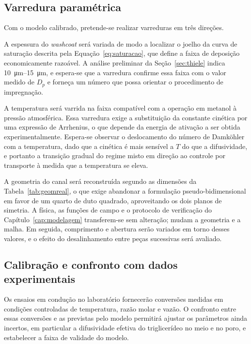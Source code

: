 \subsection{Varredura paramétrica}

Com o modelo calibrado, pretende-se realizar varreduras em três direções.

A espessura do \textit{washcoat} será variada de modo a localizar o joelho da
curva de saturação descrita pela Equação~\eqref{eq:saturacao}, que define a
faixa de deposição economicamente razoável. A análise preliminar da
Seção~\ref{sec:thiele} indica \SIrange{10}{15}{\micro\meter}, e espera-se que
a varredura confirme essa faixa com o valor medido de $D_p$ e forneça um número
que possa orientar o procedimento de impregnação.

A temperatura será varrida na faixa compatível com a operação em metanol à
pressão atmosférica. Essa varredura exige a substituição da constante cinética
por uma expressão de Arrhenius, o que depende da energia de ativação a ser
obtida experimentalmente. Espera-se observar o deslocamento do número de
Damköhler com a temperatura, dado que a cinética é mais sensível a $T$ do que a
difusividade, e portanto a transição gradual do regime misto em direção ao
controle por transporte à medida que a temperatura se eleva.

A geometria do canal será reconstruída segundo as dimensões da
Tabela~\ref{tab:geomreal}, o que exige abandonar a formulação pseudo-bidimensional
em favor de um quarto de duto quadrado, aproveitando os dois planos de simetria.
A física, as funções de campo e o protocolo de verificação do
Capítulo~\ref{cap:modelagem} transferem-se sem alteração; mudam a geometria e a
malha. Em seguida, comprimento e abertura serão variados em torno desses valores,
e o efeito do desalinhamento entre peças sucessivas será avaliado.

\subsection{Calibração e confronto com dados experimentais}

Os ensaios em condução no laboratório fornecerão conversões medidas em condições
controladas de temperatura, razão molar e vazão. O confronto entre essas
conversões e as previstas pelo modelo permitirá ajustar os parâmetros ainda
incertos, em particular a difusividade efetiva do triglicerídeo no meio e no
poro, e estabelecer a faixa de validade do modelo.

